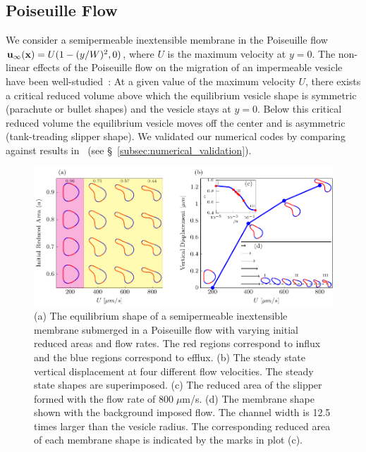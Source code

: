 \documentclass[prb,preprint,showpacs,preprintnumbers,amsmath,amssymb,longbibliography]{revtex4-1}
\newif\ifTikz
\begin{document}
\subsection{Poiseuille Flow}
We consider a semipermeable inextensible membrane in the Poiseuille flow
$\mathbf{u}_\infty(\mathbf{x}) = U(1-(y/W)^2,0)$, where $U$ is the maximum velocity at
$y=0$. The non-linear effects of the Poiseuille flow on the migration of
an impermeable vesicle have been well-studied~\cite{kao-bir-mis2009}: At
a given value of the maximum velocity $U$, there exists a critical
reduced volume above which the equilibrium vesicle shape is symmetric
(parachute or bullet shapes) and the vesicle stays at $y=0$. Below this
critical reduced volume the equilibrium vesicle moves off the center and
is asymmetric (tank-treading slipper shape). We validated our numerical
codes by comparing against results in~\citet{kao-bir-mis2009} (see
\S~\ref{subsec:numerical_validation}).

\begin{figure}[htp]
  \centering
  \ifTikz
  
  \else
  \includegraphics{figures/parabolicComposite.pdf}
  \fi
  \caption{\label{fig:parabolicComposite} (a) The equilibrium shape of
  a semipermeable inextensible membrane submerged in a Poiseuille flow with varying
  initial reduced areas and flow rates. The red regions correspond to
  influx and the blue regions correspond to efflux. (b) The steady
  state vertical displacement at four different flow velocities. The
  steady state shapes are superimposed. (c) The reduced area of the
  slipper formed with the flow rate of $800 \; \mu$m/s. (d) The membrane
  shape shown with the background imposed flow. The channel width is
  12.5 times larger than the vesicle radius. The corresponding reduced
  area of each membrane shape is indicated by the marks in plot (c).}
\end{figure}
\end{document}
